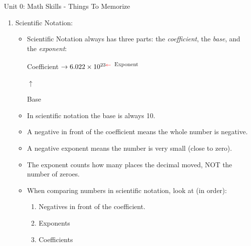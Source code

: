 \documentclass[letterpaper, 12pt]{article}
\newcommand{\assnum}{Unit 0: Math Skills}
\newcommand{\assname}{Things To Memorize}
\begin{document}
\fancyfoot[r]{\assnum}	


\begin{center} \assnum{} - \assname{}
\end{center}





\begin{enumerate}
	\item Scientific Notation:
		\begin{itemize}
			\item Scientific Notation always has three parts: the \textit{coefficient}, the \textit{base}, and the \textit{exponent}:
			\begin{center}
				\color{blue} Coefficient $\rightarrow \color{black} 6.022 \times 10^{23 \color{red}\leftarrow}$ \textsuperscript{\color{red}Exponent} \color{black}
				
				\hspace{.7in} \color{orange}$\uparrow$
				
				\hspace{.7in} Base \color{black}
			\end{center}
		\item In scientific notation the \color{orange} base \color{black}is always 10. 
		\item A negative in front of the  \color{blue} coefficient \color{black} means the whole number is negative. 
		\item  A negative \color{red} exponent \color{black} means the number is very small (close to zero). \color{black}
		\item  The \color{red} exponent \color{black} counts how many places the decimal moved, NOT the number of zeroes.	
		\item When comparing numbers in scientific notation, look at (in order): 
		\begin{enumerate}
			\item  Negatives in front of the \color{blue} coefficient. \color{black}
			\item \color{red}Exponents \color{black}
			\item \color{blue}Coefficients \color{black}
		\end{enumerate}
	

\end{itemize}
\end{enumerate}
\end{document}

